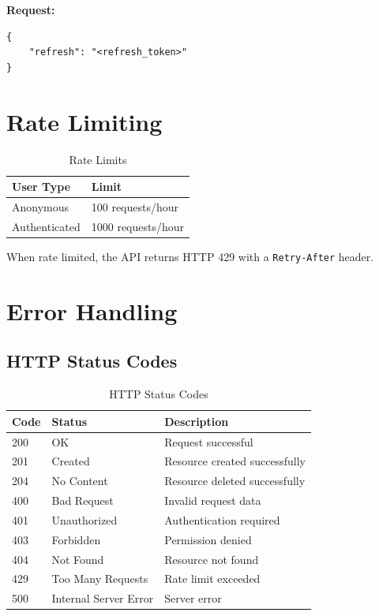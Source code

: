 \documentclass[11pt,a4paper]{article}
\begin{document}
\textbf{Request:}
\begin{lstlisting}[style=json]
{
    "refresh": "<refresh_token>"
}
\end{lstlisting}

\section{Rate Limiting}

\begin{table}[H]
\centering
\begin{tabular}{@{}ll@{}}
\toprule
\textbf{User Type} & \textbf{Limit} \\
\midrule
Anonymous & 100 requests/hour \\
Authenticated & 1000 requests/hour \\
\bottomrule
\end{tabular}
\caption{Rate Limits}
\end{table}

When rate limited, the API returns HTTP 429 with a \texttt{Retry-After} header.

\section{Error Handling}

\subsection{HTTP Status Codes}

\begin{table}[H]
\centering
\begin{tabular}{@{}lll@{}}
\toprule
\textbf{Code} & \textbf{Status} & \textbf{Description} \\
\midrule
200 & OK & Request successful \\
201 & Created & Resource created successfully \\
204 & No Content & Resource deleted successfully \\
400 & Bad Request & Invalid request data \\
401 & Unauthorized & Authentication required \\
403 & Forbidden & Permission denied \\
404 & Not Found & Resource not found \\
429 & Too Many Requests & Rate limit exceeded \\
500 & Internal Server Error & Server error \\
\bottomrule
\end{tabular}
\caption{HTTP Status Codes}
\end{table}
\end{document}
